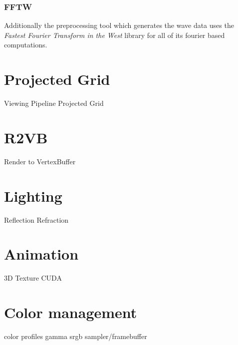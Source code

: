 \subsubsection{FFTW}
Additionally the preprocessing tool which generates the wave data uses the
\textit{Fastest Fourier Transform in the West} library\cite{misc:fftw} for all
of its fourier based computations.

\section{Projected Grid}
Viewing Pipeline
Projected Grid

\section{R2VB}
Render to VertexBuffer

\section{Lighting}
Reflection
Refraction

\section{Animation}
3D Texture
CUDA

\section{Color management}
color profiles
gamma
srgb sampler/framebuffer